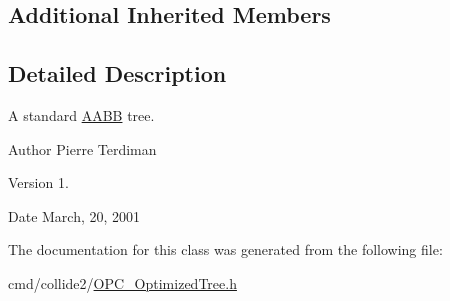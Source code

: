 \subsection*{Additional Inherited Members}


\subsection{Detailed Description}
A standard \hyperlink{classAABB}{A\+A\+BB} tree.

\begin{DoxyAuthor}{Author}
Pierre Terdiman 
\end{DoxyAuthor}
\begin{DoxyVersion}{Version}
1. 
\end{DoxyVersion}
\begin{DoxyDate}{Date}
March, 20, 2001 
\end{DoxyDate}


The documentation for this class was generated from the following file\+:\begin{DoxyCompactItemize}
\item 
cmd/collide2/\hyperlink{OPC__OptimizedTree_8h}{O\+P\+C\+\_\+\+Optimized\+Tree.\+h}\end{DoxyCompactItemize}

